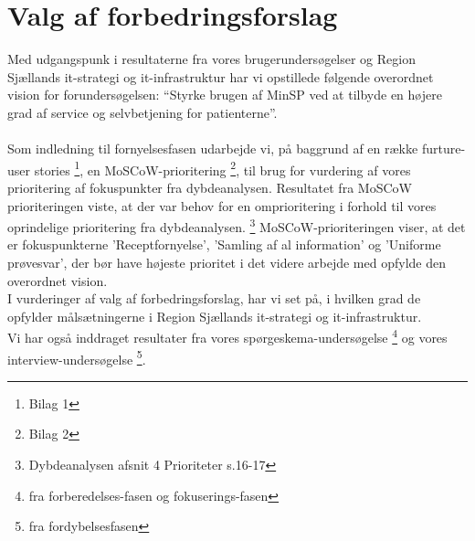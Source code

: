 %
%
%
%
%
%
%
%
%
%
%
%
%
%
%
%
%
%
%
%
%
%
%
%
%
%
%
%
%
\section{Valg af forbedringsforslag}
Med udgangspunk i resultaterne fra vores brugerundersøgelser og Region Sjællands it-strategi og it-infrastruktur har vi opstillede følgende overordnet vision for forundersøgelsen: “Styrke brugen af MinSP ved at tilbyde en højere grad af service og selvbetjening for patienterne”.\\
\\
Som indledning til fornyelsesfasen udarbejde vi, på baggrund af en række furture-user stories \footnote{Bilag 1}, en MoSCoW-prioritering \footnote{Bilag 2}, til brug for vurdering af vores prioritering af fokuspunkter fra dybdeanalysen.
Resultatet fra MoSCoW prioriteringen viste, at der var behov for en omprioritering i forhold til vores oprindelige prioritering fra dybdeanalysen. \footnote{Dybdeanalysen afsnit 4 Prioriteter s.16-17}
%
MoSCoW-prioriteringen viser, at det er fokuspunkterne 'Receptfornyelse', 'Samling af al information' og 'Uniforme prøvesvar', der bør have højeste prioritet i det videre arbejde med opfylde den overordnet vision. %
\\
I vurderinger af valg af forbedringsforslag, har vi set på, i hvilken grad de opfylder målsætningerne i Region Sjællands it-strategi og it-infrastruktur. \\
Vi har også inddraget resultater fra vores spørgeskema-undersøgelse \footnote{fra forberedelses-fasen og fokuserings-fasen} og vores interview-undersøgelse \footnote{fra fordybelsesfasen}.
